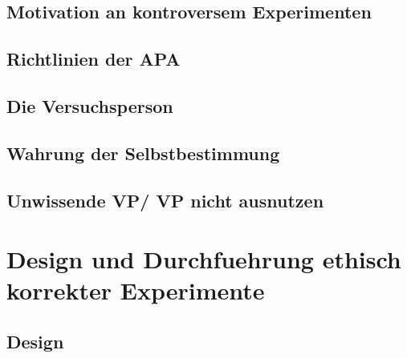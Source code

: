 \documentclass[10pt]{beamer}
\begin{document}
	
\subsection{Motivation an kontroversem Experimenten}
\subsection{Richtlinien der APA}
%
\subsection{Die Versuchsperson}
\subsection{Wahrung der Selbstbestimmung}

\subsection{Unwissende VP/ VP nicht ausnutzen}

\section{Design und Durchfuehrung ethisch korrekter Experimente}
\subsection{Design}
\end{document}
